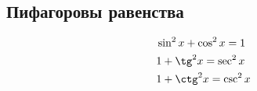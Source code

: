\subsection*{Пифагоровы равенства}

\begin{align*}
  &\sin^2 x + \cos^2 x = 1 \\
  &1 + \tg^2 x = \sec^2 x \\
  &1 + \ctg^2 x = \csc^2 x
\end{align*}